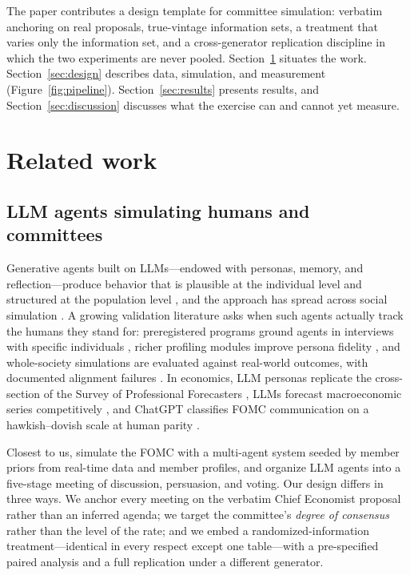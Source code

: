 \documentclass[11pt,a4paper]{article}
\begin{document}
The paper contributes a design template for committee simulation: verbatim anchoring on real proposals, true-vintage information sets, a treatment that varies only the information set, and a cross-generator replication discipline in which the two experiments are never pooled. Section~\ref{sec:related} situates the work. Section~\ref{sec:design} describes data, simulation, and measurement (Figure~\ref{fig:pipeline}). Section~\ref{sec:results} presents results, and Section~\ref{sec:discussion} discusses what the exercise can and cannot yet measure.

\section{Related work}\label{sec:related}

\subsection{LLM agents simulating humans and committees}

Generative agents built on LLMs---endowed with personas, memory, and reflection---produce behavior that is plausible at the individual level and structured at the population level \parencite{park2023generative}, and the approach has spread across social simulation \parencite{gao2024large}. A growing validation literature asks when such agents actually track the humans they stand for: preregistered programs ground agents in interviews with specific individuals \parencite{park2024interviews}, richer profiling modules improve persona fidelity \parencite{cerqueira2025motif}, and whole-society simulations are evaluated against real-world outcomes, with documented alignment failures \parencite{hou2025vacsim}. In economics, LLM personas replicate the cross-section of the Survey of Professional Forecasters \parencite{hansen2025spf}, LLMs forecast macroeconomic series competitively \parencite{carriero2024macro}, and ChatGPT classifies FOMC communication on a hawkish--dovish scale at human parity \parencite{hansen2024chatgpt}.

Closest to us, \textcite{kazinnik2025fomc} simulate the FOMC with a multi-agent system seeded by member priors from real-time data and member profiles, and \textcite{seok2024minifed} organize LLM agents into a five-stage meeting of discussion, persuasion, and voting. Our design differs in three ways. We anchor every meeting on the verbatim Chief Economist proposal rather than an inferred agenda; we target the committee's \emph{degree of consensus} rather than the level of the rate; and we embed a randomized-information treatment---identical in every respect except one table---with a pre-specified paired analysis and a full replication under a different generator.
\end{document}
